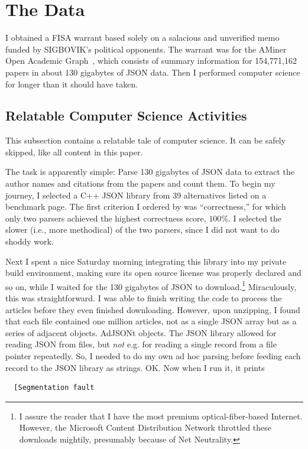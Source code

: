 \documentclass[twocolumn]{article}
\begin{document}
\section{The Data}

I obtained a FISA warrant based solely on a salacious and unverified
memo funded by SIGBOVIK's political opponents. The warrant was for the
AMiner Open Academic Graph~\cite{Tang08ArnetMiner}, which consists of
summary information for 154,771,162 papers in about 130 gigabytes of
JSON data. Then I performed computer science for longer than it should
have taken.


\subsection{Relatable Computer Science Activities}

This subsection contains a relatable tale of computer science. It can
be safely skipped, like all content in this paper.

\smallskip
The task is apparently simple: Parse 130 gigabytes of JSON data to
extract the author names and citations from the papers and count them.
To begin my journey, I selected a C++ JSON library from 39
alternatives listed on a benchmark page.\cite{yip2018native} The first
criterion I ordered by was ``correctness,'' for which only two parsers
achieved the highest correctness score, $100\%$. I selected the slower
(i.e., more methodical) of the two parsers, since I did not want to do
shoddy work.

Next I spent a nice Saturday morning integrating this library into my
private build environment, making sure its open source license was
properly declared and so on, while I waited for the 130 gigabytes of
JSON to download.\footnote{I assure the reader that I have the most
  premium optical-fiber-based Internet. However, the Microsoft Content
  Distribution Network throttled these downloads mightily, presumably
  because of Net Neutrality.} Miraculously, this was straightforward.
I was able to finish writing the code to process the articles before
they even finished downloading. However, upon unzipping, I found that
each file contained one million articles, not as a single JSON array
but as a series of adjacent objects. AdJSONt objects. The JSON library
allowed for reading JSON from files, but {\em not} e.g. for reading a
single record from a file pointer repeatedly. So, I needed to do my
own ad hoc parsing before feeding each record to the JSON library as
strings. OK. Now when I run it, it prints
\begin{verbatim}
  [Segmentation fault
\end{verbatim}
\end{document}

